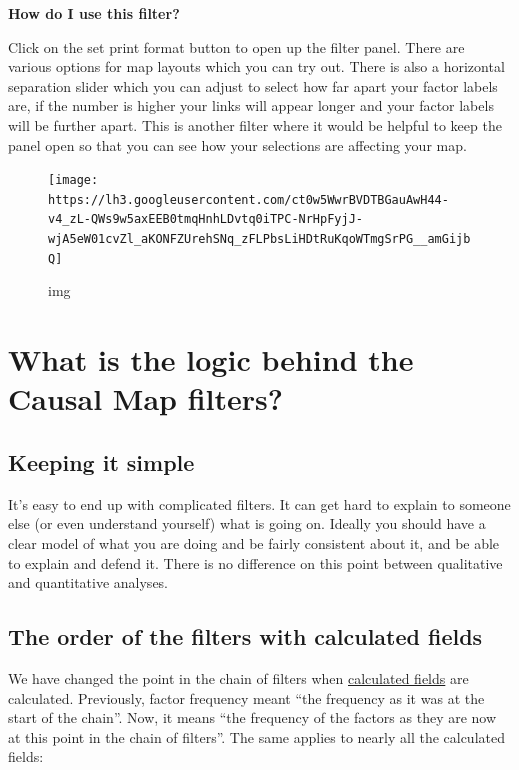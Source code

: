 \documentclass[
]{book}
\begin{document}
\textbf{How do I use this filter?}

Click on the set print format button to open up the filter panel. There are various options for map layouts which you can try out. There is also a horizontal separation slider which you can adjust to select how far apart your factor labels are, if the number is higher your links will appear longer and your factor labels will be further apart. This is another filter where it would be helpful to keep the panel open so that you can see how your selections are affecting your map.

\begin{figure}
\centering
\texttt{[image: https://lh3.googleusercontent.com/ct0w5WwrBVDTBGauAwH44-v4\_zL-QWs9w5axEEB0tmqHnhLDvtq0iTPC-NrHpFyjJ-wjA5eW01cvZl\_aKONFZUrehSNq\_zFLPbsLiHDtRuKqoWTmgSrPG\_\_amGijbQ]}
\caption{img}
\end{figure}

\hypertarget{what-is-the-logic-behind-the-causal-map-filters}{%
\chapter{What is the logic behind the Causal Map filters?}\label{what-is-the-logic-behind-the-causal-map-filters}}

\hypertarget{keeping-it-simple}{%
\section{Keeping it simple}\label{keeping-it-simple}}

It's easy to end up with complicated filters. It can get hard to explain to someone else (or even understand yourself) what is going on. Ideally you should have a clear model of what you are doing and be fairly consistent about it, and be able to explain and defend it. There is no difference on this point between qualitative and quantitative analyses.

\hypertarget{the-order-of-the-filters-with-calculated-fields}{%
\section{The order of the filters with calculated fields}\label{the-order-of-the-filters-with-calculated-fields}}

We have changed the point in the chain of filters when \protect\hyperlink{xcalculated-fields}{calculated fields} are calculated. Previously, factor frequency meant ``the frequency as it was at the start of the chain''. Now, it means ``the frequency of the factors as they are now at this point in the chain of filters''. The same applies to nearly all the calculated fields:
\end{document}
